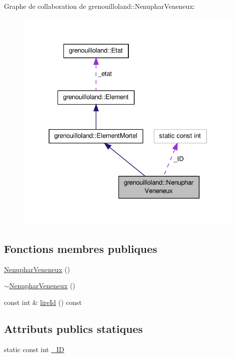 Graphe de collaboration de grenouilloland\-:\-:Nenuphar\-Veneneux\-:
\nopagebreak
\begin{figure}[H]
\begin{center}
\leavevmode
\includegraphics[width=322pt]{classgrenouilloland_1_1NenupharVeneneux__coll__graph}
\end{center}
\end{figure}
\subsection*{Fonctions membres publiques}
\begin{DoxyCompactItemize}
\item 
\hyperlink{classgrenouilloland_1_1NenupharVeneneux_a32998a823da3d578faab3eda91cee837}{Nenuphar\-Veneneux} ()
\item 
\hyperlink{classgrenouilloland_1_1NenupharVeneneux_a350f1d66b75499dd18a7adf455d9e680}{$\sim$\-Nenuphar\-Veneneux} ()
\item 
const int \& \hyperlink{classgrenouilloland_1_1NenupharVeneneux_afbf5c6a0b2f88d65027a6582dca402d1}{lire\-Id} () const 
\end{DoxyCompactItemize}
\subsection*{Attributs publics statiques}
\begin{DoxyCompactItemize}
\item 
static const int \hyperlink{classgrenouilloland_1_1NenupharVeneneux_a2cfb9132dd85224aae2b01e769133d22}{\-\_\-\-I\-D}
\end{DoxyCompactItemize}

